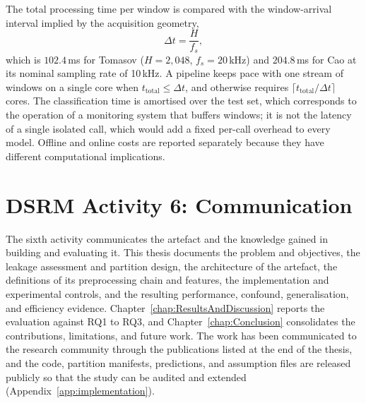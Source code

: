 The total processing time per window is compared with the window-arrival interval implied by the acquisition geometry,
\begin{equation}
	\Delta t = \frac{H}{f_s},
	\label{eq:arrival}
\end{equation}
which is $102.4$\,ms for Tomasov ($H = 2{,}048$, $f_s = 20$\,kHz) and $204.8$\,ms for Cao at its nominal sampling rate of 10\,kHz. A pipeline keeps pace with one stream of windows on a single core when $t_{\mathrm{total}} \le \Delta t$, and otherwise requires $\lceil t_{\mathrm{total}} / \Delta t \rceil$ cores. The classification time is amortised over the test set, which corresponds to the operation of a monitoring system that buffers windows; it is not the latency of a single isolated call, which would add a fixed per-call overhead to every model. Offline and online costs are reported separately because they have different computational implications.

\section{DSRM Activity 6: Communication}
\label{sec:chap3DSRMCommunication}
The sixth activity communicates the artefact and the knowledge gained in building and evaluating it. This thesis documents the problem and objectives, the leakage assessment and partition design, the architecture of the artefact, the definitions of its preprocessing chain and features, the implementation and experimental controls, and the resulting performance, confound, generalisation, and efficiency evidence. Chapter~\ref{chap:ResultsAndDiscussion} reports the evaluation against RQ1 to RQ3, and Chapter~\ref{chap:Conclusion} consolidates the contributions, limitations, and future work. The work has been communicated to the research community through the publications listed at the end of the thesis, and the code, partition manifests, predictions, and assumption files are released publicly so that the study can be audited and extended (Appendix~\ref{app:implementation}).

